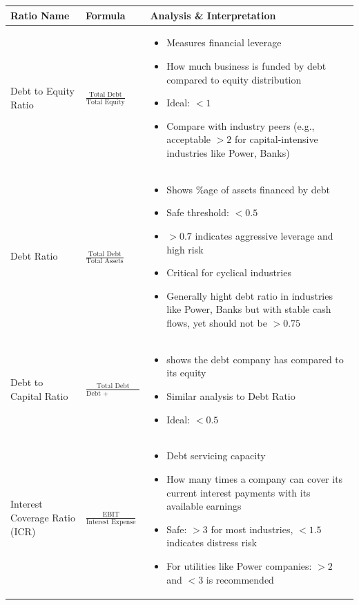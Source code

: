 \documentclass[12pt]{article}
\begin{document}
\begin{longtable}{|>{\raggedright\arraybackslash}m{4.5cm}|>{\raggedright\arraybackslash}m{5cm}|>{\raggedright\arraybackslash}m{6cm}|}
\hline
\textbf{Ratio Name} & \textbf{Formula} & \textbf{Analysis \& Interpretation} \\
\hline
Debt to Equity Ratio & 
$\frac{\text{Total Debt}}{\text{Total Equity}}$ &
\begin{itemize}
\item Measures financial leverage
\item How much business is funded by debt compared to equity distribution
\item Ideal: $<1$ 
\item Compare with industry peers (e.g., acceptable $>2$ for capital-intensive industries like Power, Banks) 
\end{itemize} \\
\hline

Debt Ratio & 
$\frac{\text{Total Debt}}{\text{Total Assets}}$ &
\begin{itemize}
\item Shows \%age of assets financed by debt
\item Safe threshold: $<0.5$
\item $>0.7$ indicates aggressive leverage and high risk
\item Critical for cyclical industries 
\item Generally hight debt ratio in industries like Power, Banks but with stable cash flows, yet should not be $>0.75$
\end{itemize} \\
\hline

Debt to Capital Ratio & 
$\frac{\text{Total Debt}}{\text{Debt + Shareholders' Equity}}$ &
\begin{itemize}
\item shows the debt company has compared to its equity
\item Similar analysis to Debt Ratio
\item Ideal: $<0.5$
\end{itemize} \\
\hline

Interest Coverage Ratio (ICR) & 
$\frac{\text{EBIT}}{\text{Interest Expense}}$ &
\begin{itemize}
\item Debt servicing capacity
\item How many times a company can cover its current interest payments with its available earnings
\item Safe: $>3$ for most industries, $<1.5$ indicates distress risk
\item For utilities like Power companies: $>2$  and $<3$ is recommended
\end{itemize} \\
\hline


\end{longtable}
\end{document}
